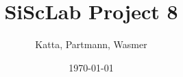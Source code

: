 \documentclass{beamer}
\begin{document}
\title{SiScLab Project 8}  
\author{Katta, Partmann, Wasmer}
\date{\today} 

\begin{frame}
\titlepage
\end{frame}






\end{document}

